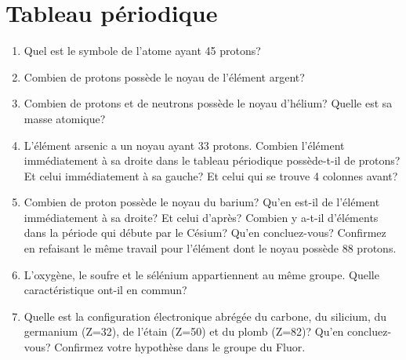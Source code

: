 \section{Tableau p\'eriodique}
\begin{enumerate}[\bf 1)]
\item Quel est le symbole de l'atome ayant 45 protons?
\item Combien de protons poss\`ede le noyau de l'\'el\'ement argent?
\item Combien de protons et de neutrons poss\`ede le noyau d'h\'elium? Quelle est sa masse atomique?
\item L'\'el\'ement arsenic a un noyau ayant 33 protons. Combien l'\'el\'ement imm\'ediatement \`a sa droite dans le tableau
p\'eriodique poss\`ede-t-il de protons? Et celui imm\'ediatement \`a sa gauche? Et celui qui se trouve
4 colonnes avant?
\item Combien de proton poss\`ede le noyau du barium? Qu'en est-il de l'\'el\'ement imm\'ediatement \`a sa droite? Et celui d'apr\`es?
Combien y a-t-il d'\'el\'ements dans la p\'eriode qui d\'ebute par le C\'esium? Qu'en concluez-vous? Confirmez en refaisant le m\^eme travail pour
l'\'el\'ement dont le noyau poss\`ede 88 protons.
\item L'oxyg\`ene, le soufre et le s\'el\'enium appartiennent au m\^eme groupe.
Quelle caract\'eristique ont-il en commun?
\item Quelle est la configuration \'electronique abrégée du carbone, du silicium, du germanium (Z=32),
de l'\'etain (Z=50) et du plomb (Z=82)?
Qu'en concluez-vous? Confirmez votre hypoth\`ese dans le groupe du Fluor.
%

\end{enumerate}
